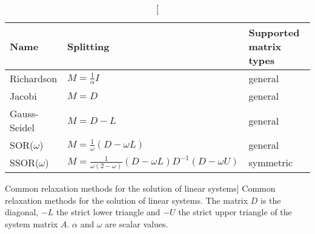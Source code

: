 \begin{table}[t]
\begin{center}
\begin{tabular}{lll}
Name & Splitting & Supported matrix types \\
\midrule
Richardson & 
    $M = \frac{1}{\alpha}I$ &
    general \\[1em]
Jacobi &
    $M = D$ &
    general \\[1em]
Gauss-Seidel &
    $M = D - L$ &
general \\[1em]
SOR($\omega$) &
    $M = \frac{1}{\omega}(D - \omega L)$ &
general \\[1em]
SSOR($\omega$) &
    $M = \frac{1}{\omega(2 - \omega)}(D - \omega L)D^{-1}(D - \omega U)$ &
symmetric \\[1em]
\end{tabular}
\end{center}
\caption
[Common relaxation methods for the solution of linear systems]
{Common relaxation methods for the solution of linear
systems. The matrix $D$ is the diagonal, $-L$ the strict lower triangle and $-U$
the strict upper triangle of the system matrix $A$. $\alpha$ and $\omega$ are
scalar values.}
\label{introduction:tab:relaxation-methods}
\end{table}

